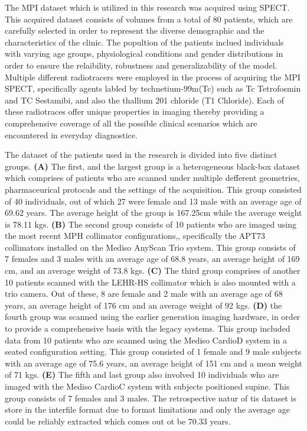 The MPI dataset which is utilized in this research was acquired using SPECT. This acquired dataset consists of volumes from a total of 80 patients, which are carefully selected in order to represent the diverse demographic and the characteristics of the clinic. The popultion of the patients inclued individuals with varying age groups, physiological conditions and gender distributions in order to ensure the relaibility, robustness and generalizability of the model. Multiple different radiotracers were employed in the process of acquiring the MPI SPECT, specifically agents labled by technetium-99m(Tc) such as Tc Tetrofosmin and TC Sestamibi, and also the thallium 201 chloride (T1 Chloride). Each of these radiotraces offer unique properties in imaging thereby providing a comprehensive coverage of all the possible clinical scenarios which are encountered in everyday diagnostice. 

The dataset of the patients used in the research is divided into five distinct groups. \textbf{(A)} The first, and the largest group is a heterogeneous black-box dataset which comprises of patients who are scanned under multiple defferent geometries, pharmaceurical protocals and the settings of the acquisition. This group consisted of 40 individuals, out of which 27 were female and 13 male with an average age of 69.62 years. The average height of the group is 167.25cm while the average weight is 78.11 kgs. \textbf{(B)} The second group consists of 10 patients who are imaged using the most recent MPH collimator configurations,, specifically the APT73 collimators installed on the Mediso AnyScan Trio system. This group consists of 7 females and 3 males with an average age of 68.8 years, an average height of 169 cm, and an average weight of 73.8 kgs. \textbf{(C)} The third group comprises of another 10 patients scanned with the LEHR-HS collimator which is also mounted with a trio camera. Out of these, 8 are female and 2 male with an average age of 68 years, an average height of 176 cm and an average weight of 92 kgs. \textbf{(D)} the fourth group was scanned using the earlier generation imaging hardware, in order to provide a comprehensive basis with the legacy systems. This group included data from 10 patients who are scanned using the Mediso CardioD system in a seated configuration setting. This group consisted of 1 female and 9 male subjects with an average age of 75.6 years, an average height of 151 cm and a mean weight of 71 kgs. \textbf{(E)} The fifth and last group also involved 10 individuals who are imaged with the Mediso CardioC system with subjects positioned supine. This group consists of 7 females and 3 males. The retrospective natur of tis dataset is store in the interfile format due to format limitations and only the average age could be reliably extracted which comes out ot be 70.33 years.

